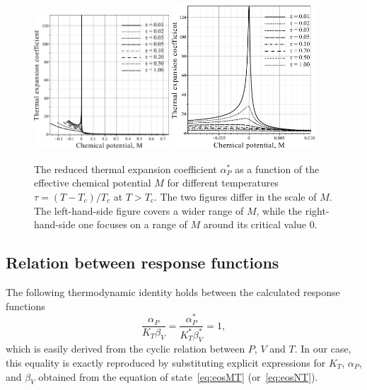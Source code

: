 \documentclass[12pt]{article}
\begin{document}
	\begin{figure}[h!]
		\centering \includegraphics[width=0.45\textwidth]{f4b.pdf}
		\includegraphics[width=0.475\textwidth]{f4c.pdf}
		\vskip-3mm\caption{The reduced thermal expansion coefficient $\alpha^*_P$ as a function of the effective chemical potential $M$ for different temperatures $\tau = (T - T_c)/T_c$ at $T > T_c$. The two figures differ in the scale of $M$. The left-hand-side figure covers a wider range of $M$, while the right-hand-side one focuses on a range of $M$ around its critical value $0$.
		}\label{fig4b}
	\end{figure}
	
	\subsection{Relation between response functions}
	The following thermodynamic identity holds between the calculated response functions
	\begin{equation}
		\frac{\alpha_P}{K_T \beta_V} = \frac{\alpha^*_P}{K^*_T \beta^*_V} = 1,
	\end{equation}
	which is easily derived from the cyclic relation between $P$, $V$ and $T$. In our case, this equality is exactly reproduced by substituting explicit expressions for $K_T$, $\alpha_P$, and $\beta_V$ obtained from the equation of state~\eqref{eq:eosMT} (or~\eqref{eq:eosNT}). 
	
\end{document}

